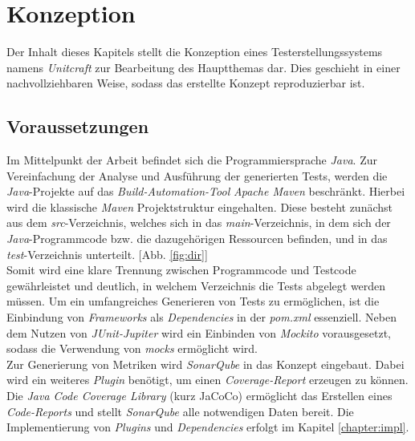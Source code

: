 \chapter{Konzeption}\label{chapter:concept}
Der Inhalt dieses Kapitels stellt die Konzeption eines Testerstellungssystems namens \textit{Unitcraft} zur Bearbeitung des Hauptthemas dar. Dies geschieht in einer nachvollziehbaren Weise, sodass das erstellte Konzept reproduzierbar ist.

\section{Voraussetzungen}
Im Mittelpunkt der Arbeit befindet sich die Programmiersprache \textit{Java}. Zur Vereinfachung der Analyse und Ausführung der generierten Tests, werden die \textit{Java}-Projekte auf das \textit{Build-Automation-Tool} \textit{Apache Maven} beschränkt. Hierbei wird die klassische \textit{Maven} Projektstruktur eingehalten. Diese besteht zunächst aus dem \textit{src}-Verzeichnis, welches sich in das \textit{main}-Verzeichnis, in dem sich der \textit{Java}-Programmcode bzw. die dazugehörigen Ressourcen befinden, und in das \textit{test}-Verzeichnis unterteilt. \cite{MavenIntroductionStandard} [Abb. \ref{fig:dir}]\\ Somit wird eine klare Trennung zwischen Programmcode und Testcode gewährleistet und deutlich, in welchem Verzeichnis die Tests abgelegt werden müssen.  \newpage
Um ein umfangreiches Generieren von Tests zu ermöglichen, ist die Einbindung von \textit{Frameworks} als \textit{Dependencies} in der \textit{pom.xml} essenziell. Neben dem Nutzen von \textit{JUnit-Jupiter} wird ein Einbinden von \textit{Mockito} vorausgesetzt, sodass die Verwendung von \textit{mocks} ermöglicht wird.\\
Zur Generierung von Metriken wird \textit{SonarQube} in das Konzept eingebaut. Dabei wird ein weiteres \textit{Plugin} benötigt, um einen \textit{Coverage-Report} erzeugen zu können. Die \textit{Java Code Coverage Library} (kurz JaCoCo) ermöglicht das Erstellen eines \textit{Code-Reports} und stellt \textit{SonarQube} alle notwendigen Daten bereit.
Die Implementierung von \textit{Plugins} und \textit{Dependencies} erfolgt im Kapitel \ref{chapter:impl}.

